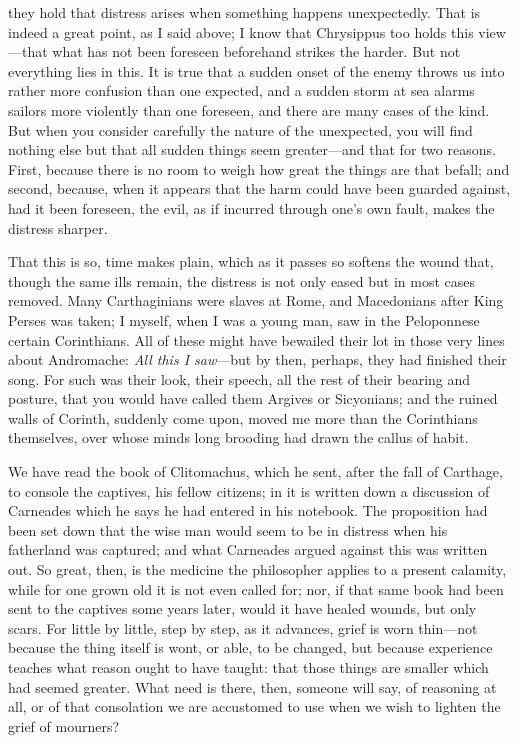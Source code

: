  they hold that distress arises when something happens unexpectedly. That is indeed a great point, as I said above; I know that Chrysippus too holds this view—that what has not been foreseen beforehand strikes the harder. But not everything lies in this. It is true that a sudden onset of the enemy throws us into rather more confusion than one expected, and a sudden storm at sea alarms sailors more violently than one foreseen, and there are many cases of the kind. But when you consider carefully the nature of the unexpected, you will find nothing else but that all sudden things seem greater—and that for two reasons. First, because there is no room to weigh how great the things are that befall; and second, because, when it appears that the harm could have been guarded against, had it been foreseen, the evil, as if incurred through one's own fault, makes the distress sharper.

 That this is so, time makes plain, which as it passes so softens the wound that, though the same ills remain, the distress is not only eased but in most cases removed. Many Carthaginians were slaves at Rome, and Macedonians after King Perses was taken; I myself, when I was a young man, saw in the Peloponnese certain Corinthians. All of these might have bewailed their lot in those very lines about Andromache: \textit{All this I saw}—but by then, perhaps, they had finished their song. For such was their look, their speech, all the rest of their bearing and posture, that you would have called them Argives or Sicyonians; and the ruined walls of Corinth, suddenly come upon, moved me more than the Corinthians themselves, over whose minds long brooding had drawn the callus of habit.

 We have read the book of Clitomachus, which he sent, after the fall of Carthage, to console the captives, his fellow citizens; in it is written down a discussion of Carneades which he says he had entered in his notebook. The proposition had been set down that the wise man would seem to be in distress when his fatherland was captured; and what Carneades argued against this was written out. So great, then, is the medicine the philosopher applies to a present calamity, while for one grown old it is not even called for; nor, if that same book had been sent to the captives some years later, would it have healed wounds, but only scars. For little by little, step by step, as it advances, grief is worn thin—not because the thing itself is wont, or able, to be changed, but because experience teaches what reason ought to have taught: that those things are smaller which had seemed greater. What need is there, then, someone will say, of reasoning at all, or of that consolation we are accustomed to use when we wish to lighten the grief of mourners?

